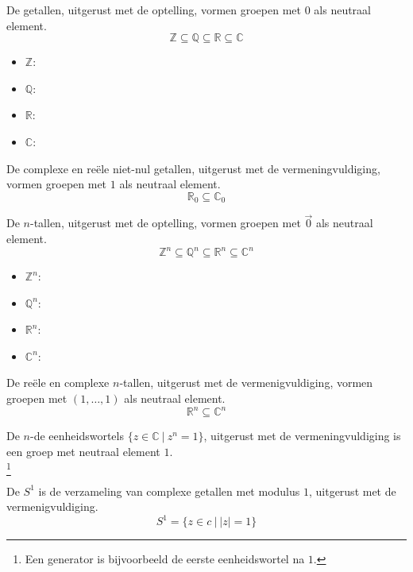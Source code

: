 \documentclass[main.tex]{subfiles}
\begin{document}
\begin{vb}
  De getallen, uitgerust met de optelling, vormen groepen met $0$ als neutraal element.
  \[ \mathbb{Z} \subseteq \mathbb{Q} \subseteq \mathbb{R} \subseteq \mathbb{C} \]
  \begin{itemize}
  \item $\mathbb{Z}$: 
  \item $\mathbb{Q}$: \cycln
  \item $\mathbb{R}$: \cycln
  \item $\mathbb{C}$: \cycln
  \end{itemize}
\commj 
\end{vb}

\begin{vb}
  De complexe en re\"ele niet-nul getallen, uitgerust met de vermeningvuldiging, vormen groepen met $1$ als neutraal element.
  \[ \mathbb{R}_{0} \subseteq \mathbb{C}_{0} \]
\commj \cycln
\end{vb}

\begin{vb}
  De $n$-tallen, uitgerust met de optelling, vormen groepen met $\vec{0}$ als neutraal element.
  \[ \mathbb{Z}^{n} \subseteq \mathbb{Q}^{n} \subseteq \mathbb{R}^{n} \subseteq \mathbb{C}^{n} \]
  \begin{itemize}
  \item $\mathbb{Z}^{n}$: 
  \item $\mathbb{Q}^{n}$: \cycln
  \item $\mathbb{R}^{n}$: \cycln
  \item $\mathbb{C}^{n}$: \cycln
  \end{itemize}
\commj
\end{vb}

\begin{vb}
  De re\"ele en complexe $n$-tallen, uitgerust met de vermenigvuldiging, vormen groepen met $(1,\dotsc,1)$ als neutraal element.
  \[ \mathbb{R}^{n} \subseteq \mathbb{C}^{n} \]
\commj \cycln
\end{vb}

\begin{vb}
  De $n$-de eenheidswortels $\{ z \in \mathbb{C}\ |\ z^{n} = 1 \}$, uitgerust met de vermeningvuldiging is een groep met neutraal element $1$.\\
\commj {}\footnote{Een generator is bijvoorbeeld de eerste eenheidswortel na $1$.}
\end{vb}

\begin{de}
  De  $S^{1}$ is de verzameling van complexe getallen met modulus $1$, uitgerust met de vermenigvuldiging.
  \[ S^{1} = \{ z \in c\ |\ |z| = 1 \} \]
\commj \cycln
\end{de}
\end{document}
